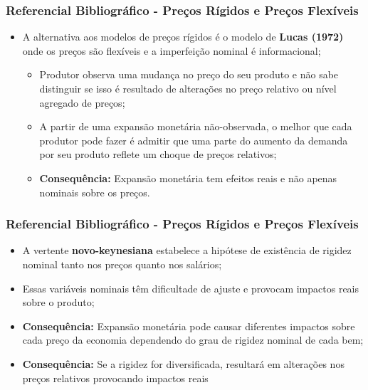 \documentclass[aspectratio=169]{beamer}
\begin{document}
\begin{frame}\frametitle{Referencial Bibliográfico - Preços Rígidos e Preços Flexíveis}
  \begin{itemize}
  \item A alternativa aos modelos de preços rígidos é o modelo de \textbf{Lucas (1972)} onde os preços são flexíveis e a imperfeição nominal é informacional;
    \begin{itemize}
    \item Produtor observa uma mudança no preço do seu produto e não sabe distinguir se isso é resultado de alterações no preço relativo ou nível agregado de preços;
    \item A partir de uma expansão monetária não-observada, o melhor que cada produtor pode fazer é admitir que uma parte do aumento da demanda por seu produto reflete um choque de preços relativos;
    \item \textbf{Consequência:} Expansão monetária tem efeitos reais e não apenas nominais sobre os preços.
    \end{itemize}
  \end{itemize}
\end{frame}

\begin{frame}\frametitle{Referencial Bibliográfico - Preços Rígidos e Preços Flexíveis}
  \begin{itemize}
  \item A vertente \textbf{novo-keynesiana} estabelece a hipótese de existência de rigidez nominal tanto nos preços quanto nos salários;
  \item Essas variáveis nominais têm dificultade de ajuste e provocam impactos reais sobre o produto;
  \item \textbf{Consequência:} Expansão monetária pode causar diferentes impactos sobre cada preço da economia dependendo do grau de rigidez nominal de cada bem;
  \item \textbf{Consequência:} Se a rigidez for diversificada, resultará em alterações nos preços relativos provocando impactos reais
  \end{itemize}
\end{frame}



% 
% 
% 
 
\end{document}
